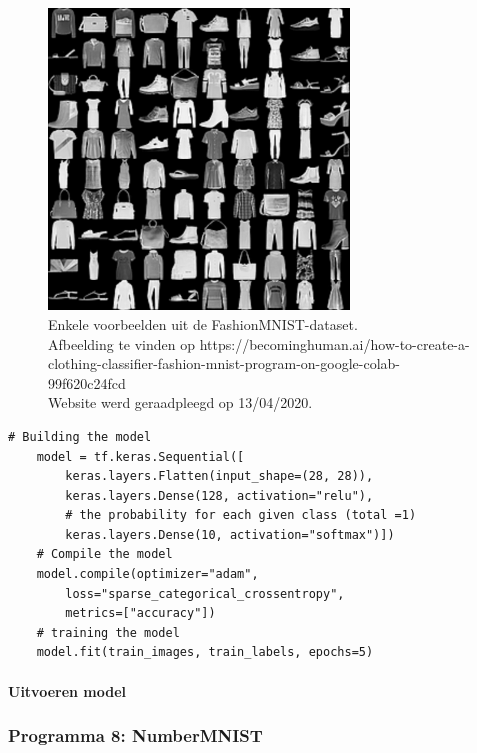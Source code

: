 			
			\begin{figure}
				\centering
				\includegraphics[width=80mm]{afbeeldingen/FashionMNIST_kledij.PNG}
				\caption{Enkele voorbeelden uit de FashionMNIST-dataset. \\Afbeelding te vinden op https://becominghuman.ai/how-to-create-a-clothing-classifier-fashion-mnist-program-on-google-colab-99f620c24fcd\\ Website werd geraadpleegd op 13/04/2020.}
				\label{fig:FashionMNIST-kledij}
			\end{figure}
	\begin{lstlisting}[caption={Cre\"eren en trainen van sequentieel model voor FashionMNIST.}, captionpos=b,label={lst:FashionMNISTtrain}]
	# Building the model
	model = tf.keras.Sequential([
		keras.layers.Flatten(input_shape=(28, 28)),
		keras.layers.Dense(128, activation="relu"),
		# the probability for each given class (total =1)
		keras.layers.Dense(10, activation="softmax")]) 
	# Compile the model
	model.compile(optimizer="adam",
		loss="sparse_categorical_crossentropy",
		metrics=["accuracy"])
	# training the model
	model.fit(train_images, train_labels, epochs=5)
	\end{lstlisting}			
			
		
			
			\paragraph{Uitvoeren model}
			
			

		\subsubsection{Programma 8: NumberMNIST}
